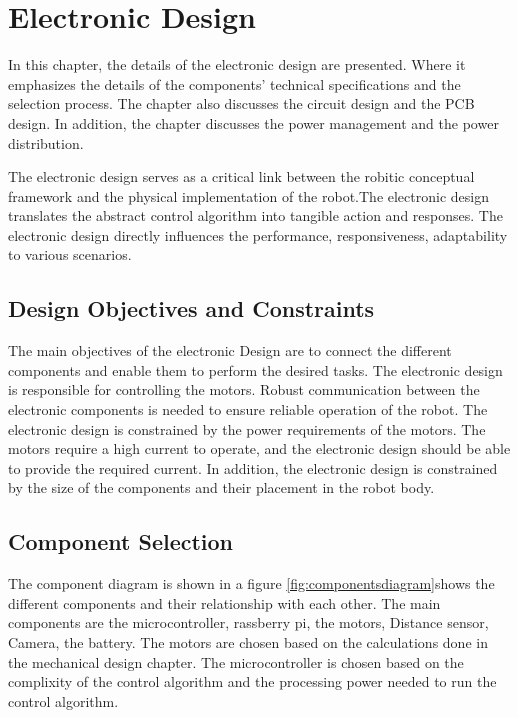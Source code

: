 \chapter{Electronic Design}

\graphicspath{{./Figures/Electronic Design/}}
In this chapter, the details of the electronic design are presented.
Where it emphasizes the details of the components' technical specifications and the selection process.
The chapter also discusses the circuit design and the PCB design.
In addition, the chapter discusses the power management and the power distribution.

The electronic design serves as a critical link between the robitic conceptual framework and the physical implementation of the robot.The electronic design translates the abstract control algorithm into tangible action and responses.
The electronic design directly influences the performance, responsiveness, adaptability to various scenarios.
\newpage

\section{Design Objectives and Constraints}
The main objectives of the electronic Design are to connect the different components and enable them to perform the desired tasks.
The electronic design is responsible for controlling the motors.
Robust communication between the electronic components is needed to ensure reliable operation of the robot.
The electronic design is constrained by the power requirements of the motors.
The motors require a high current to operate, and the electronic design should be able to provide the required current.
In addition, the electronic design is constrained by the size of the components and their placement in the robot body.

\section{Component Selection}
The component diagram is shown in a figure \ref{fig:componentsdiagram}shows the different components and their relationship with each other.
The main components are the microcontroller, rassberry pi, the motors, Distance sensor, Camera, the battery. The motors are chosen based on the calculations done in the mechanical design chapter. The microcontroller is chosen based on the complixity of the control algorithm and the processing power needed to run the control algorithm.

